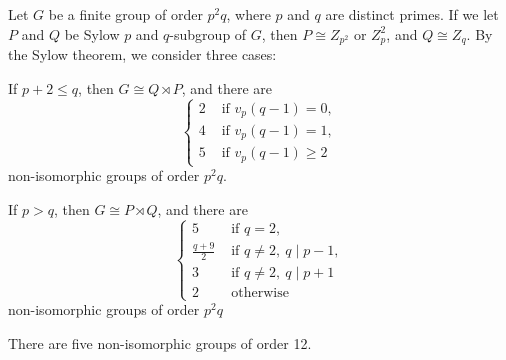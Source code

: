 \documentclass{../../large}
\begin{document}
\begin{prb}
\end{prb}

\begin{prb}
\end{prb}


\begin{prb}
Let $G$ be a finite group of order $p^2q$, where $p$ and $q$ are distinct primes.
If we let $P$ and $Q$ be Sylow $p$ and $q$-subgroup of $G$, then $P\cong Z_{p^2}\text{ or }Z_p^2$, and $Q\cong Z_q$.
By the Sylow theorem, we consider three cases:
\begin{parts}
\item If $p+2\le q$, then $G\cong Q\rtimes P$, and there are
\[\begin{cases}
2&\text{ if }v_p(q-1)=0,\\
4&\text{ if }v_p(q-1)=1,\\
5&\text{ if }v_p(q-1)\ge2
\end{cases}\]
non-isomorphic groups of order $p^2q$.
\item If $p>q$, then $G\cong P\rtimes Q$, and there are
\[\begin{cases}
5&\text{ if }q=2,\\
\frac{q+9}2&\text{ if }q\ne2,\ q\mid p-1,\\
3&\text{ if }q\ne2,\ q\mid p+1\\
2&\text{ otherwise }
\end{cases}\]
non-isomorphic groups of order $p^2q$
\item There are five non-isomorphic groups of order 12.
\end{parts}
\end{prb}
\end{document}
